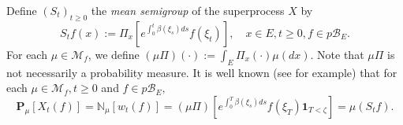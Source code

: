 \documentclass[UTF8]{pkuthss}
\theoremstyle{plain}
\theoremstyle{definition}
\numberwithin{equation}{section}
\begin{document}
	Define $(S_t)_{t \geq 0}$ the \emph{mean semigroup} of the superprocess $X$ by
\begin{equation}
\label{eq: mean semigroup}
	S_t f(x)
	:= \Pi_x[e^{\int_0^t \beta(\xi_s) ds} f(\xi_t)],
	\quad x \in E,t \geq 0,f \in p\mathscr B_E.
\end{equation}
	For each $\mu \in \mathcal M_f$, we define $ (\mu\Pi)(\cdot):= \int_E \Pi_x(\cdot)\mu(dx)$.
	Note that $\mu\Pi$ is not necessarily a probability measure.
	It is well known (see \cite[Proposition 2.27]{Li2011MeasureValued} for example) that for each $\mu \in \mathcal M_f, t \geq 0$ and $f \in p\mathscr B_E,$
\begin{equation}
\label{eq: mean formula}
	\mathbf P_\mu[X_t(f)]
	= \mathbb N_\mu[w_t(f)]
	= (\mu\Pi)[e^{\int_0^T \beta(\xi_s)ds}f(\xi_T)\mathbf 1_{T<\zeta}]
	=\mu(S_t f).
\end{equation}
\end{document}
